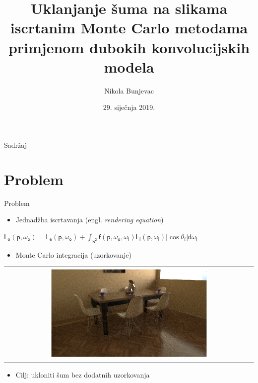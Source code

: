 \documentclass[12pt]{beamer}
\title{Uklanjanje šuma na slikama iscrtanim Monte Carlo
metodama primjenom dubokih konvolucijskih modela}
\date{29. siječnja 2019.}
\author{Nikola Bunjevac}
\institute{Fakultet elektrotehnike i računarstva}
\newcommand{\eng}[1]{(engl. \textsl{#1}\/)}
\newcommand{\vect}[1]{\bm{\mathsf{#1}}}
\begin{document}
  \maketitle

  \begin{frame}{Sadržaj}
    \tableofcontents
  \end{frame}

  \section{Problem}

  \begin{frame}{Problem}
    \begin{itemize}
    \item Jednadžba iscrtavanja \eng{rendering equation}
    \end{itemize}
    \begin{math}
      \mathsf{L_o}(\vect{p}, \vect{\omega}_{\mathsf{o}}) = \mathsf{L_e}(\vect{p}, \vect{\omega}_{\mathsf{o}}) + \int_{\mathsf{S^2}} \mathsf{f}(\vect{p}, \vect{\omega}_{\mathsf{o}}, \vect{\omega}_{\mathsf{i}}) \mathsf{L_i}(\vect{p}, \vect{\omega}_{\mathsf{i}}) |\cos\theta_i| \mathsf{d}\vect{\omega}_{\mathsf{i}}
    \end{math}

    \begin{itemize}
    \item Monte Carlo integracija (uzorkovanje)
    \end{itemize}
    \begin{center}
    \begin{tabular}{c}
      \includegraphics[width=0.65\textwidth]{noisy_color.png}
    \end{tabular}
    \end{center}
    \begin{itemize}
    \item Cilj: ukloniti šum bez dodatnih uzorkovanja
    \end{itemize}


  \end{frame}
\end{document}
